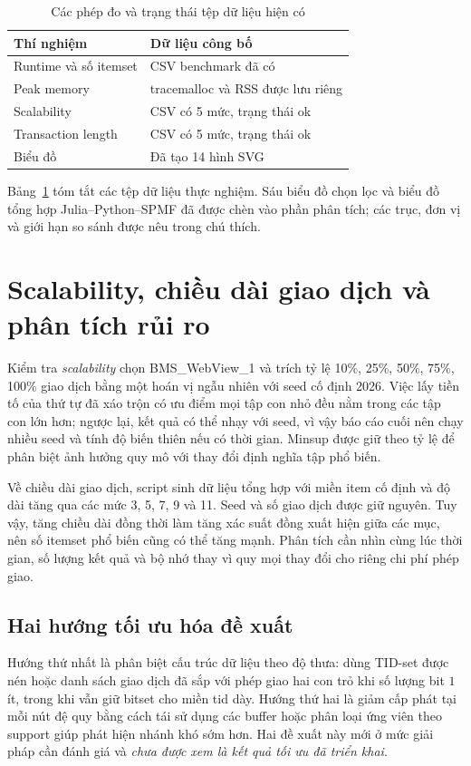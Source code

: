 \documentclass[conference,10pt]{IEEEtran}
\begin{document}
\begin{table}[t]
\centering\caption{Các phép đo và trạng thái tệp dữ liệu hiện có}\label{tab:expplan}
\begin{tabular}{@{}p{}p{}@{}}\toprule
Thí nghiệm & Dữ liệu công bố\\\midrule
Runtime và số itemset & CSV benchmark đã có\\
Peak memory & tracemalloc và RSS được lưu riêng\\
Scalability & CSV có 5 mức, trạng thái ok\\
Transaction length & CSV có 5 mức, trạng thái ok\\
Biểu đồ & Đã tạo 14 hình SVG\\\bottomrule
\end{tabular}
\end{table}

Bảng~\ref{tab:expplan} tóm tắt các tệp dữ liệu thực nghiệm. Sáu biểu đồ chọn lọc và biểu đồ tổng hợp Julia--Python--SPMF đã được chèn vào phần phân tích; các trục, đơn vị và giới hạn so sánh được nêu trong chú thích.

\section{Scalability, chiều dài giao dịch và phân tích rủi ro}
Kiểm tra \emph{scalability} chọn BMS\_WebView\_1 và trích tỷ lệ 10\%, 25\%, 50\%, 75\%, 100\% giao dịch bằng một hoán vị ngẫu nhiên với seed cố định 2026. Việc lấy tiền tố của thứ tự đã xáo trộn có ưu điểm mọi tập con nhỏ đều nằm trong các tập con lớn hơn; ngược lại, kết quả có thể nhạy với seed, vì vậy báo cáo cuối nên chạy nhiều seed và tính độ biến thiên nếu có thời gian. Minsup được giữ theo tỷ lệ để phân biệt ảnh hưởng quy mô với thay đổi định nghĩa tập phổ biến.

Về chiều dài giao dịch, script sinh dữ liệu tổng hợp với miền item cố định và độ dài tăng qua các mức 3, 5, 7, 9 và 11. Seed và số giao dịch được giữ nguyên. Tuy vậy, tăng chiều dài đồng thời làm tăng xác suất đồng xuất hiện giữa các mục, nên số itemset phổ biến cũng có thể tăng mạnh. Phân tích cần nhìn cùng lúc thời gian, số lượng kết quả và bộ nhớ thay vì quy mọi thay đổi cho riêng chi phí phép giao.

\subsection{Hai hướng tối ưu hóa đề xuất}
Hướng thứ nhất là phân biệt cấu trúc dữ liệu theo độ thưa: dùng TID-set được nén hoặc danh sách giao dịch đã sắp với phép giao hai con trỏ khi số lượng bit $1$ ít, trong khi vẫn giữ bitset cho miền tid dày. Hướng thứ hai là giảm cấp phát tại mỗi nút đệ quy bằng cách tái sử dụng các buffer hoặc phân loại ứng viên theo support giúp phát hiện nhánh khó sớm hơn. Hai đề xuất này mới ở mức giải pháp cần đánh giá và \emph{chưa được xem là kết quả tối ưu đã triển khai}.
\end{document}

